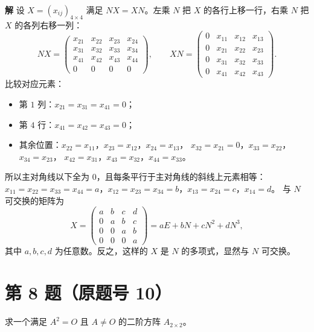 \documentclass[11pt,a4paper]{ctexart}
\newenvironment{problem}[1]
  {\par\medskip\noindent\textbf{#1}\quad}
  {\par}
\newenvironment{solution}
  {\par\noindent\textbf{解}\quad}
  {\par}
\begin{document}
\begin{solution}
设 $X=(x_{ij})_{4\times4}$ 满足 $NX=XN$。左乘 $N$ 把 $X$ 的各行上移一行，右乘 $N$ 把 $X$ 的各列右移一列：
\[
NX=\begin{pmatrix}
x_{21}&x_{22}&x_{23}&x_{24}\\
x_{31}&x_{32}&x_{33}&x_{34}\\
x_{41}&x_{42}&x_{43}&x_{44}\\
0&0&0&0
\end{pmatrix},\qquad
XN=\begin{pmatrix}
0&x_{11}&x_{12}&x_{13}\\
0&x_{21}&x_{22}&x_{23}\\
0&x_{31}&x_{32}&x_{33}\\
0&x_{41}&x_{42}&x_{43}
\end{pmatrix}.
\]
比较对应元素：
\begin{itemize}
  \item 第 $1$ 列：$x_{21}=x_{31}=x_{41}=0$；
  \item 第 $4$ 行：$x_{41}=x_{42}=x_{43}=0$；
  \item 其余位置：$x_{22}=x_{11}$，$x_{23}=x_{12}$，$x_{24}=x_{13}$，
        $x_{32}=x_{21}=0$，$x_{33}=x_{22}$，$x_{34}=x_{23}$，
        $x_{42}=x_{31}$，$x_{43}=x_{32}$，$x_{44}=x_{33}$。
\end{itemize}
所以主对角线以下全为 $0$，且每条平行于主对角线的斜线上元素相等：
$x_{11}=x_{22}=x_{33}=x_{44}=a$，$x_{12}=x_{23}=x_{34}=b$，$x_{13}=x_{24}=c$，$x_{14}=d$。
与 $N$ 可交换的矩阵为
\[
X=\begin{pmatrix}a&b&c&d\\0&a&b&c\\0&0&a&b\\0&0&0&a\end{pmatrix}
=aE+bN+cN^2+dN^3,
\]
其中 $a,b,c,d$ 为任意数。反之，这样的 $X$ 是 $N$ 的多项式，显然与 $N$ 可交换。
\end{solution}

\section*{第 8 题（原题号 10）}

\begin{problem}{}求一个满足 $A^2=O$ 且 $A\neq O$ 的二阶方阵 $A_{2\times2}$。\end{problem}
\end{document}
